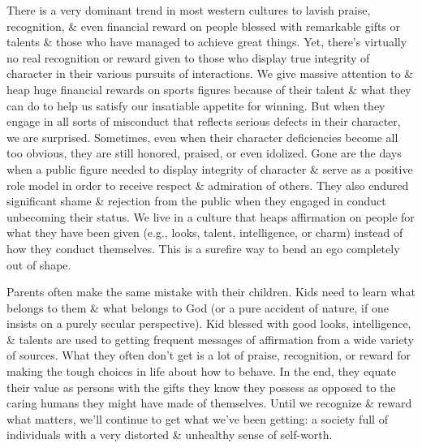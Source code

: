 \documentclass{article}
\numberwithin{equation}{section}
\begin{document}
There is a very dominant trend in most western cultures to lavish praise, recognition, \& even financial reward on people blessed with remarkable gifts or talents \& those who have managed to achieve great things. Yet, there's virtually no real recognition or reward given to those who display true integrity of character in their various pursuits of interactions. We give massive attention to \& heap huge financial rewards on sports figures because of their talent \& what they can do to help us satisfy our insatiable appetite for winning. But when they engage in all sorts of misconduct that reflects serious defects in their character, we are surprised. Sometimes, even when their character deficiencies become all too obvious, they are still honored, praised, or even idolized. Gone are the days when a public figure needed to display integrity of character \& serve as a positive role model in order to receive respect \& admiration of others. They also endured significant shame \& rejection from the public when they engaged in conduct unbecoming their status. We live in a culture that heaps affirmation on people for what they have been given (e.g., looks, talent, intelligence, or charm) instead of how they conduct themselves. This is a surefire way to bend an ego completely out of shape.

Parents often make the same mistake with their children. Kids need to learn what belongs to them \& what belongs to God (or a pure accident of nature, if one insists on a purely secular perspective). Kid blessed with good looks, intelligence, \& talents are used to getting frequent messages of affirmation from a wide variety of sources. What they often don't get is a lot of praise, recognition, or reward for making the tough choices in life about how to behave. In the end, they equate their value as persons with the gifts they know they possess as opposed to the caring humans they might have made of themselves. Until we recognize \& reward what matters, we'll continue to get what we've been getting: a society full of individuals with a very distorted \& unhealthy sense of self-worth.
\end{document}
